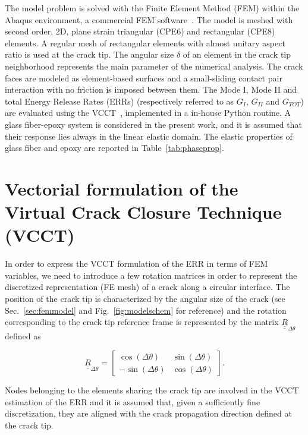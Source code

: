 \documentclass[review]{elsarticle}
\begin{document}
The model problem is solved with the Finite Element Method (FEM) within the Abaqus environment, a commercial FEM software~\cite{abq12}. The model is meshed with second order, 2D, plane strain triangular (CPE6) and rectangular (CPE8) elements. A regular mesh of rectangular elements with almost unitary aspect ratio is used at the crack tip. The angular size $\delta$ of an element in the crack tip neighborhood represents the main parameter of the numerical analysis. The crack faces are modeled as element-based surfaces and a small-sliding contact pair interaction with no friction is imposed between them. The Mode I, Mode II and total Energy Release Rates (ERRs) (respectively referred to as $G_{I}$, $G_{II}$ and $G_{TOT}$) are evaluated using the VCCT~\cite{Krueger2004}, implemented in a in-house Python routine. A glass fiber-epoxy system is considered in the present work, and it is assumed that their response lies always in the linear elastic domain. The elastic properties of glass fiber and epoxy are reported in Table~\ref{tab:phaseprop}.

\section{Vectorial formulation of the Virtual Crack Closure Technique (VCCT)}
 
In order to express the VCCT formulation of the ERR in terms of FEM variables, we need to introduce a few rotation matrices in order to represent the discretized representation (FE mesh) of a crack along a circular interface. The position of the crack tip is characterized by the angular size of the crack (see Sec.~\ref{sec:femmodel} and Fig.~\ref{fig:modelschem} for reference) and the rotation corresponding to the crack tip reference frame is represented by the matrix $\underline{\underline{R}}_{\Delta\theta}$ defined as

\begin{equation}\label{eq:Rmatrix}
\underline{\underline{R}}_{\Delta\theta}=\begin{bmatrix}
\cos\left(\Delta\theta\right) & \sin\left(\Delta\theta\right) \\
-\sin\left(\Delta\theta\right) & \cos\left(\Delta\theta\right)
\end{bmatrix}.
\end{equation}

Nodes belonging to the elements sharing the crack tip are involved in the VCCT estimation of the ERR and it is assumed that, given a sufficiently fine discretization, they are aligned with the crack propagation direction defined at the crack tip.
\end{document}
